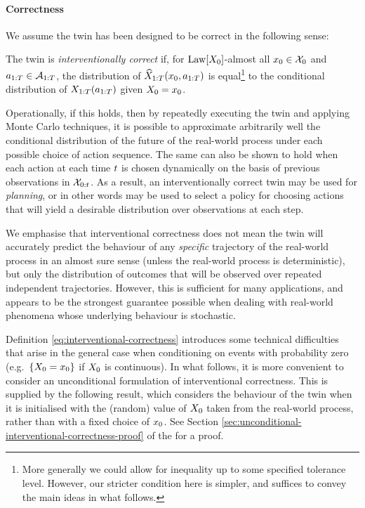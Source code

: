 \paragraph{Correctness}

%
%
We assume the twin has been designed to be correct in the following sense:

%


\begin{definition}[Correctness] \label{eq:interventional-correctness}
    The twin is \emph{interventionally correct} if, for $\mathrm{Law}[X_0]$-almost all $x_0 \in \mathcal{X}_0$ and $a_{1:T} \in \mathcal{A}_{1:T}$, the distribution of $\widehat{X}_{1:T}(x_0, {a}_{1:T})$ is equal\footnote{More generally we could allow for inequality up to some specified tolerance level. However, our stricter condition here is simpler, and suffices to convey the main ideas in what follows.} to the conditional distribution of $X_{1:T}(a_{1:T})$ given $X_0 = x_0$.
\end{definition}


Operationally, if this holds, then by repeatedly executing the twin and applying Monte Carlo techniques, it is possible to approximate arbitrarily well the conditional distribution of the future of the real-world process under each possible choice of action sequence.
The same can also be shown to hold when each action at each time $t$ is chosen dynamically on the basis of previous observations in $\mathcal{X}_{0:t}$. %
As a result, an interventionally correct twin may be used for \emph{planning}, or in other words may be used to select a policy for choosing actions that will yield a desirable distribution over observations at each step.
%

We emphasise that interventional correctness does not mean the twin will accurately predict the behaviour of any \emph{specific} trajectory of the real-world process in an almost sure sense (unless the real-world process is deterministic), but only the distribution of outcomes that will be observed over repeated independent trajectories.
However, this is sufficient for many applications, and appears to be the strongest guarantee possible when dealing with real-world phenomena whose underlying behaviour is stochastic.

Definition \ref{eq:interventional-correctness} introduces some technical difficulties that arise in the general case when conditioning on events with probability zero (e.g.\ $\{X_0 = x_0\}$ if $X_0$ is continuous).
In what follows, it is more convenient to consider an unconditional formulation of interventional correctness.
This is supplied by the following result, which considers the behaviour of the twin when it is initialised with the (random) value of $X_0$ taken from the real-world process, rather than with a fixed choice of $x_0$.
See Section \ref{sec:unconditional-interventional-correctness-proof} of the \AppendixName for a proof.

